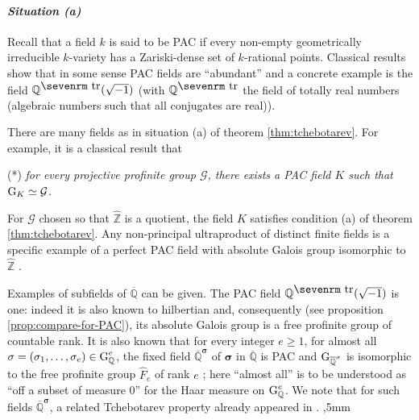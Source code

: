 \documentclass[12pt,english]{amsart}
\newtheorem{twisting lemma}[theorem]{Twisting lemma}
\begin{document}
\paragraph{\it Situation {\rm (a)} }
\vskip 1mm

Recall that a field $k$ is said to be PAC if every non-empty geometrically irreducible $k$-variety has a Zariski-dense set of $k$-rational points. Classical results show that in some sense PAC fields are ``abundant'' \cite[theorem 18.6.1]{FrJa} and a concrete example is the field ${\mathbb{Q}}^{{\hbox{\sevenrm tr}}}(\sqrt{-1})$ (with ${\mathbb{Q}}^{{\hbox{\sevenrm tr}}}$ the field of  totally real numbers (algebraic numbers such that all conjugates are real)). 

There are many fields as in situation (a) of theorem \ref{thm:tchebotarev}. For example, it is a classical result \cite[corollary 23.1.3]{FrJa} that 
\vskip 1mm

\noindent
(*) {\it for every projective profinite group ${\mathcal G}$, there exists a PAC field $K$ such that ${\hbox{\rm G}}_K \simeq {\mathcal G}$}.
\vskip 1mm

\noindent
For ${\mathcal G}$ chosen so that $\widehat {\mathbb{Z}}$ is a quotient, the field $K$ satisfies condition (a) of theorem \ref{thm:tchebotarev}. Any non-principal ultraproduct of distinct finite fields is a specific example of a perfect PAC field with absolute Galois group isomorphic to $\widehat {\mathbb{Z}}$ \cite[proposition 7.9.1]{FrJa}. 

Examples of  subfields of  $\overline{\mathbb{Q}}$ can be given. The PAC field ${\mathbb{Q}}^{{\hbox{\sevenrm tr}}}(\sqrt{-1})$ is one: 
indeed it is also known to hilbertian and, consequently (see proposition \ref{prop:compare-for-PAC}), its absolute Galois group is a free profinite group of countable rank. It is also known that for every integer $e\geq 1$, for almost all ${\mathbf{\sigma}}=(\sigma_1,\ldots,\sigma_e)\in {\hbox{\rm G}}_{\mathbb{Q}}^e$, the fixed field $\overline{\mathbb{Q}}^{\mathbf{\sigma}}$ of ${\mathbf{\sigma}}$ in $\overline {\mathbb{Q}}$ is PAC and ${\hbox{\rm G}}_{\overline{\mathbb{Q}}^\sigma}$ is isomorphic to the free profinite group $\widehat F_e$ of rank $e$ \cite[theorems 18.5.6 \& 18.6.1]{FrJa}; here ``almost all'' is to be understood as ``off a subset of measure $0$'' for the Haar measure on ${\hbox{\rm G}}_{\mathbb{Q}}^e$. 
We note that for such fields $\overline{\mathbb{Q}}^{\mathbf{\sigma}}$, a related Tchebotarev property already
appeared in \cite{Jarden-Tchebotarev}.
,5mm
\end{document}
